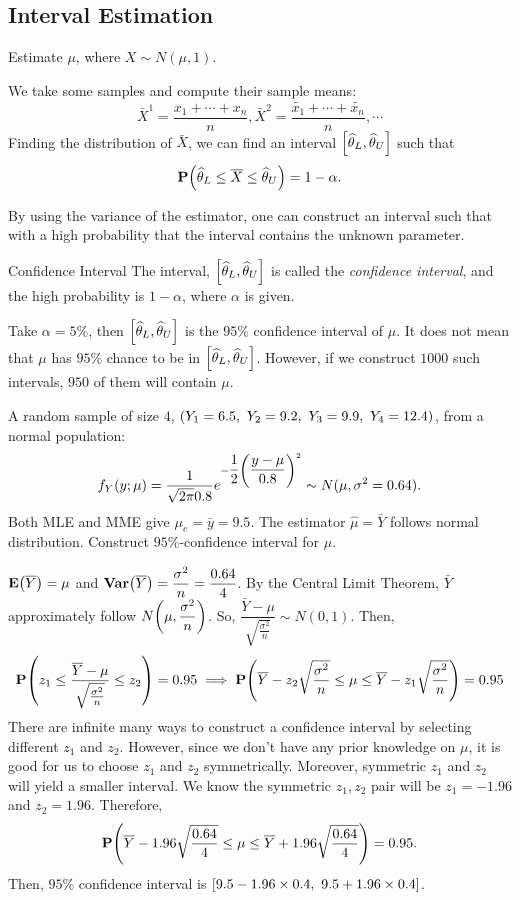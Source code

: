 \subsection{Interval Estimation}
\begin{eg}{}
	Estimate $\mu$, where $X\sim N(\mu, 1)$.\par 
	We take some samples and compute their sample means: \[\bar{X}^1=\dfrac{x_1+\cdots+x_n}{n},\bar{X}^2=\dfrac{\widetilde{x_1}+\cdots+\widetilde{x_n}}{n},\cdots\] Finding the distribution of $\bar{X}$, we can find an interval $\qty[\widehat\theta_L,\widehat\theta_U]$ such that \[\vb{P}\qty(\widehat\theta_L\leq\overline X\leq\widehat\theta_U)=1-\alpha.\]
\end{eg}
\begin{rmk}
	By using the variance of the estimator, one can construct an interval such that with a high probability that the interval contains the unknown parameter. 	
\end{rmk}
\begin{df}{Confidence Interval}
	The interval, $\qty[\widehat\theta_L,\widehat\theta_U]$	is called the \textit{confidence interval}, and the high probability is $1-\alpha$, where $\alpha$ is given. 
\end{df}
\begin{rmk}
	Take $\alpha=5\%$, then $\qty[\widehat\theta_L,\widehat\theta_U]$ is the $95\%$ confidence interval of $\mu$. It does not mean that $\mu$ has $95\%$ chance to be in $\qty[\widehat\theta_L,\widehat\theta_U]$. However, if we construct $1000$ such intervals, $950$ of them will contain $\mu$.
\end{rmk}
\begin{eg}
	A random sample of size $4$, $\qty(Y_1=6.5,\ Y_2=9.2,\ Y_3=9.9,\ Y_4=12.4)$, from a normal population: \[f_Y(y;\mu)=\dfrac{1}{\sqrt{2\pi}0.8}e^{-\dfrac{1}{2}\qty(\dfrac{y-\mu}{0.8})^2}\sim N(\mu, \sigma^2=0.64).\] Both MLE and MME give $\mu_e=\bar y=9.5$. The estimator $\hat{\mu}=\bar{Y}$ follows normal distribution. Construct $95\%$-confidence interval for $\mu$.
	\begin{sol}
		$\vb{E}\qty(\overline Y)=\mu$ and $\vb{Var}\qty(\overline Y)=\dfrac{\sigma^2}{n}=\dfrac{0.64}{4}$. By the Central Limit Theorem, $\bar{Y}$ approximately follow $N\qty(\mu,\dfrac{\sigma^2}{n})$. So, $\dfrac{\bar Y-\mu}{\sqrt{\frac{\sigma^2}{n}}}\sim N(0,1)$. Then, \[\vb{P}\qty(z_1\leq\dfrac{\overline Y-\mu}{\sqrt{\frac{\sigma^2}{n}}}\leq z_2)=0.95\implies\vb{P}\qty(\overline Y-z_2\sqrt{\dfrac{\sigma^2}{n}}\leq\mu\leq\overline Y-z_1\sqrt{\dfrac{\sigma^2}{n}})=0.95\] There are infinite many ways to construct a confidence interval by selecting different $z_1$ and $z_2$. However, since we don't have any prior knowledge on $\mu$, it is good for us to choose $z_1$ and $z_2$ symmetrically. Moreover, symmetric $z_1$ and $z_2$ will yield a smaller interval. We know the symmetric $z_1,z_2$ pair will be $z_1=-1.96$ and $z_2=1.96$. Therefore, \[\vb{P}\qty(\overline Y-1.96\sqrt{\dfrac{0.64}{4}}\leq\mu\leq\overline Y+1.96\sqrt{\dfrac{0.64}{4}})=0.95.\] Then, $95\%$ confidence interval is $\qty[9.5-1.96\times0.4,\ 9.5+1.96\times0.4]$. 
	\end{sol}
\end{eg}
